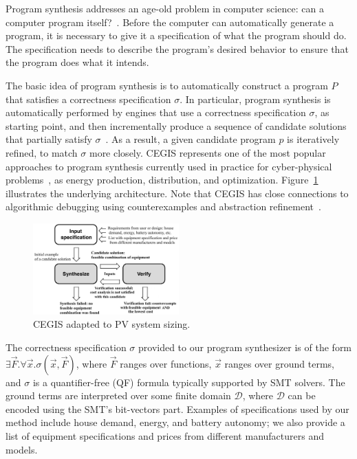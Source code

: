 \documentclass[journal]{IEEEtran}
\begin{document}
Program synthesis addresses an age-old problem in computer science: can a computer program itself?~\cite{Bornholt2019}. Before the computer can automatically generate a program, it is necessary to give it a specification of what the program should do. The specification needs to describe the program's desired behavior to ensure that the program does what it intends.

The basic idea of program synthesis is to automatically construct a program $P$ that satisfies a correctness specification $\sigma$. In particular, program synthesis is automatically performed by engines that use a correctness specification $\sigma$, as starting point, and then incrementally produce a sequence of candidate solutions that partially satisfy $\sigma$~\cite{Abateetal2017}. As a result, a given candidate program $p$ is iteratively refined, to match $\sigma$ more closely. CEGIS represents one of the most popular approaches to program synthesis currently used in practice for cyber-physical problems~\cite{Abateetal2017}, as energy production, distribution, and optimization. Figure~\ref{Counter-Example-Guided-Inductive-Synthesis} illustrates the underlying architecture. Note that CEGIS has close connections to algorithmic debugging using counterexamples and abstraction refinement~\cite{Alur}. %
%
\begin{figure}[h]
	\centering
	\includegraphics[width=0.5\textwidth]{fig2_rev2.jpg}
	\caption{CEGIS adapted to PV system sizing.}
	\label{Counter-Example-Guided-Inductive-Synthesis}
\end{figure}

The correctness specification $\sigma$ provided to our program synthesizer is of the form $\exists \vec{F} . \forall \vec{x}. \sigma(\vec{x}, \vec{F})$, where $\vec{F}$ ranges over functions, $\vec{x}$ ranges over ground terms, and $\sigma$ is a quantifier-free (QF) formula typically supported by SMT solvers. The ground terms are interpreted over some finite domain $\mathcal{D}$, where $\mathcal{D}$ can be encoded using the SMT's bit-vectors part. Examples of specifications used by our method include house demand, energy, and battery autonomy; we also provide a list of equipment specifications and prices from different manufacturers and models.
\end{document}
